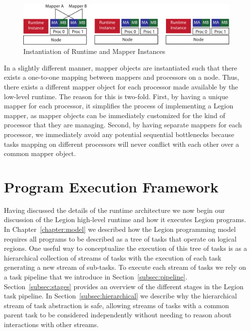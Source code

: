 \begin{figure}[t]
\centering
\includegraphics[scale=0.7]{figs/RuntimeInstances}
\caption{Instantiation of Runtime and Mapper Instances\label{fig:rtinstances}}
\end{figure}

In a slightly different manner, mapper objects are
instantiated such that there exists a one-to-one
mapping between mappers and processors on a node. 
Thus, there exists a different mapper object for 
each processor made available by the low-level 
runtime. The reason for this is two-fold.  First, 
by having a unique mapper for each processor, it 
simplifies the process of implementing a Legion 
mapper, as mapper objects can be immediately 
customized for the kind of processor that they 
are managing.  Second, by having separate mappers 
for each processor, we immediately avoid any potential 
sequential bottlenecks because tasks mapping on 
different processors will never conflict with each 
other over a common mapper object. 

\section{Program Execution Framework}
\label{sec:framework}
Having discussed the details of the runtime architecture
we now begin our discussion of the Legion high-level 
runtime and how it executes Legion programs. In 
Chapter~\ref{chapter:model} we described how the
Legion programming model requires all programs to be
described as a tree of tasks that operate on logical
regions. One useful way to conceptualize the execution 
of this tree of tasks is as a hierarchical collection of 
streams of tasks with the execution of each task generating 
a new stream of sub-tasks. To execute each stream of tasks 
we rely on a task pipeline that we introduce in 
Section~\ref{subsec:pipeline}. Section~\ref{subsec:stages}
provides an overview of the different stages in 
the Legion task pipeline. In 
Section~\ref{subsec:hierarchical} we describe
why the hierarchical stream of task abstraction is safe,
allowing streams of tasks with a common parent task
to be considered independently without needing to reason
about interactions with other streams.

